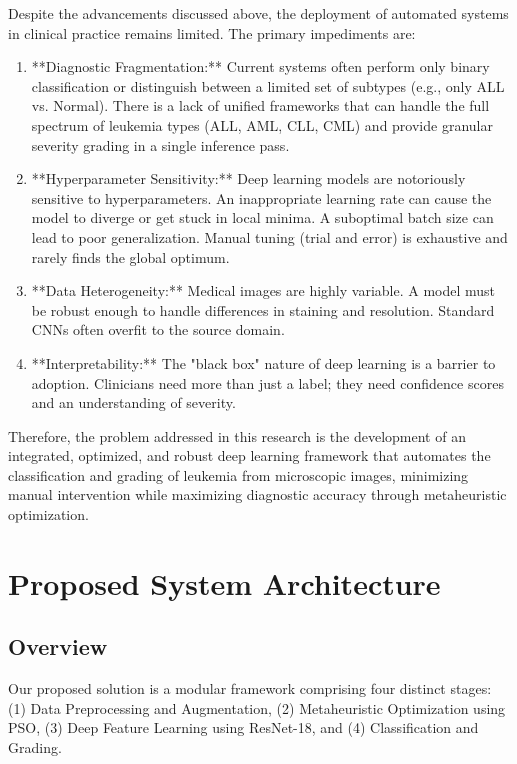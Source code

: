 \documentclass[11pt, a4paper]{article}
\begin{document}
Despite the advancements discussed above, the deployment of automated systems in clinical practice remains limited. The primary impediments are:

\begin{enumerate}
    \item **Diagnostic Fragmentation:** Current systems often perform only binary classification or distinguish between a limited set of subtypes (e.g., only ALL vs. Normal). There is a lack of unified frameworks that can handle the full spectrum of leukemia types (ALL, AML, CLL, CML) and provide granular severity grading in a single inference pass.
    
    \item **Hyperparameter Sensitivity:** Deep learning models are notoriously sensitive to hyperparameters. An inappropriate learning rate can cause the model to diverge or get stuck in local minima. A suboptimal batch size can lead to poor generalization. Manual tuning (trial and error) is exhaustive and rarely finds the global optimum.
    
    \item **Data Heterogeneity:** Medical images are highly variable. A model must be robust enough to handle differences in staining and resolution. Standard CNNs often overfit to the source domain.
    
    \item **Interpretability:** The "black box" nature of deep learning is a barrier to adoption. Clinicians need more than just a label; they need confidence scores and an understanding of severity.
\end{enumerate}

Therefore, the problem addressed in this research is the development of an integrated, optimized, and robust deep learning framework that automates the classification and grading of leukemia from microscopic images, minimizing manual intervention while maximizing diagnostic accuracy through metaheuristic optimization.

\section{Proposed System Architecture}

\subsection{Overview}
Our proposed solution is a modular framework comprising four distinct stages: (1) Data Preprocessing and Augmentation, (2) Metaheuristic Optimization using PSO, (3) Deep Feature Learning using ResNet-18, and (4) Classification and Grading.
\end{document}
